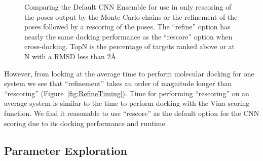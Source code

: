 \documentclass[linenumbers,doublespacing]{bmcart}
\begin{document}
\begin{figure}[tb]
	\caption{Comparing the Default CNN Ensemble for use in only rescoring of the poses output by the Monte Carlo chains or the refinement of the poses followed by a rescoring of the poses. The ``refine'' option has nearly the same docking performance as the ``rescore'' option when cross-docking. TopN is the percentage of targets ranked above or at N with a RMSD less than 2{\AA}.}
	\label{fig:CompareRescoreRefine}
\end{figure}    

However, from looking at the average time to perform molecular docking for one system we see that ``refinement'' takes an order of magnitude longer than ``rescoring'' (Figure~\ref{fig:RefineTiming}). Time for performing ``rescoring'' on an average system is similar to the time to perform docking with the Vina scoring function. We find it reasonable to use ``rescore'' as the default option for the CNN scoring due to its docking performance and runtime.

\subsection{Parameter Exploration}
\end{document}
